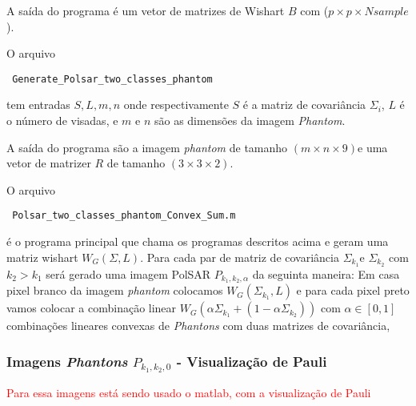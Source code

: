 A saída do programa é um vetor de matrizes  de Wishart $B$ com ($p\times p \times Nsample$). 


O arquivo \begin{verbatim} Generate_Polsar_two_classes_phantom \end{verbatim} tem entradas $S, L, m, n$ onde respectivamente $S$ é a matriz de covariância $\Sigma_i$, $L$ é o número de visadas, e $m$ e $n$ são as dimensões da imagem {\it Phantom}.   

A saída do programa são a imagem {\it phantom} de tamanho $(m\times n \times 9)$e uma vetor de matrizer $R$ de tamanho $(3 \times 3 \times 2)$.


O arquivo \begin{verbatim} Polsar_two_classes_phantom_Convex_Sum.m \end{verbatim} é o programa principal que chama os programas descritos acima e geram uma matriz wishart $W_G(\Sigma,L)$. Para cada par de matriz de covariância $\Sigma_{k_1}$e $\Sigma_{k_2}$ com $k_2>k_1$ será gerado uma imagem PolSAR $P_{k_1,k_2,\alpha}$ da seguinta maneira: Em casa pixel branco da imagem {\it phantom} colocamos $W_G(\Sigma_{k_1},L)$ e para cada pixel preto vamos colocar a combinação linear $W_G(\alpha\Sigma_{k_1}+(1-\alpha\Sigma_{k_2}))$ com $\alpha\in[0,1]$ combinações lineares convexas de {\it Phantons} com duas matrizes de covariância,  
 
\subsubsection{Imagens  {\it Phantons} $P_{k_1,k_2,0}$ - Visualização de Pauli} 


\textcolor{red}{Para essa imagens está sendo usado o matlab, com a visualização de Pauli}

